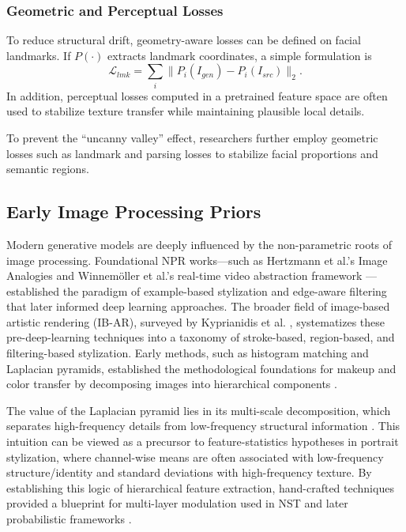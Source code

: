 \documentclass[journal]{IEEEtran}
\begin{document}
\subsubsection{Geometric and Perceptual Losses}
To reduce structural drift, geometry-aware losses can be defined on facial landmarks. If $P(\cdot)$ extracts landmark coordinates, a simple formulation is
\begin{equation}
  \mathcal{L}_{lmk} = \sum_i \lVert P_i(I_{gen}) - P_i(I_{src}) \rVert_2.
\end{equation}
In addition, perceptual losses computed in a pretrained feature space are often used to stabilize texture transfer while maintaining plausible local details.

To prevent the ``uncanny valley'' effect, researchers further employ geometric losses such as landmark and parsing losses to stabilize facial proportions and semantic regions.

\subsection{Early Image Processing Priors}
\label{sec:theory:priors}
Modern generative models are deeply influenced by the non-parametric roots of image processing. Foundational NPR works---such as Hertzmann et al.'s Image Analogies \cite{hertzmann2001image} and Winnem\"oller et al.'s real-time video abstraction framework \cite{winnemoller2006real}---established the paradigm of example-based stylization and edge-aware filtering that later informed deep learning approaches. The broader field of image-based artistic rendering (IB-AR), surveyed by Kyprianidis et al. \cite{kyprianidis2013state}, systematizes these pre-deep-learning techniques into a taxonomy of stroke-based, region-based, and filtering-based stylization.
Early methods, such as histogram matching and Laplacian pyramids, established the methodological foundations for makeup and color transfer by decomposing images into hierarchical components \cite{chen2018facess,luan2017deepps,li2018linearst,park2019arbitraryst}.

The value of the Laplacian pyramid lies in its multi-scale decomposition, which separates high-frequency details from low-frequency structural information \cite{luan2017deepps}. This intuition can be viewed as a precursor to feature-statistics hypotheses in portrait stylization, where channel-wise means are often associated with low-frequency structure/identity and standard deviations with high-frequency texture. By establishing this logic of hierarchical feature extraction, hand-crafted techniques provided a blueprint for multi-layer modulation used in NST and later probabilistic frameworks \cite{gatys2015ana,huang2017arbitraryst}.
\end{document}
